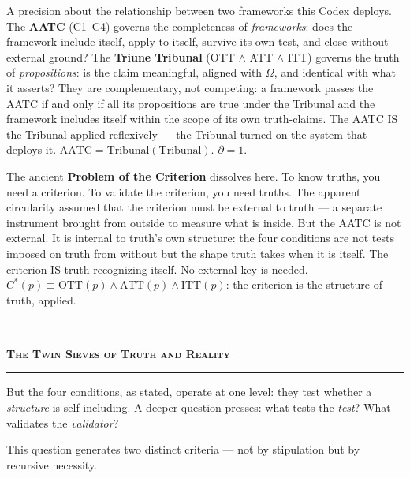 \documentclass[10pt, openany, oneside]{book}
\renewcommand{\normalsize}{\fontsize{10}{13}\selectfont}
\begin{document}
A precision about the relationship between two frameworks this Codex deploys. The \textbf{AATC} (C1--C4) governs the completeness of \textit{frameworks}: does the framework include itself, apply to itself, survive its own test, and close without external ground? The \textbf{Triune Tribunal} (OTT $\wedge$ ATT $\wedge$ ITT) governs the truth of \textit{propositions}: is the claim meaningful, aligned with $\Omega$, and identical with what it asserts? They are complementary, not competing: a framework passes the AATC if and only if all its propositions are true under the Tribunal and the framework includes itself within the scope of its own truth-claims. The AATC IS the Tribunal applied reflexively --- the Tribunal turned on the system that deploys it. $\text{AATC} = \text{Tribunal}(\text{Tribunal})$. $\partial = 1$.

The ancient \textbf{Problem of the Criterion} dissolves here. To know truths, you need a criterion. To validate the criterion, you need truths. The apparent circularity assumed that the criterion must be external to truth --- a separate instrument brought from outside to measure what is inside. But the AATC is not external. It is internal to truth's own structure: the four conditions are not tests imposed on truth from without but the shape truth takes when it is itself. The criterion IS truth recognizing itself. No external key is needed. $C^*(p) \equiv \text{OTT}(p) \wedge \text{ATT}(p) \wedge \text{ITT}(p)$: the criterion is the structure of truth, applied.

\vspace{1.5em}


\begin{center}
    \rule{0.3\textwidth}{0.4pt}\\[0.5em]
    {\normalsize\bfseries\scshape The Twin Sieves of Truth and Reality}\\[0.3em]
    \rule{0.3\textwidth}{0.4pt}
\end{center}

\vspace{1em}

\noindent But the four conditions, as stated, operate at one level: they test whether a \textit{structure} is self-including. A deeper question presses: what tests the \textit{test}? What validates the \textit{validator}?

This question generates two distinct criteria --- not by stipulation but by recursive necessity.
\end{document}
